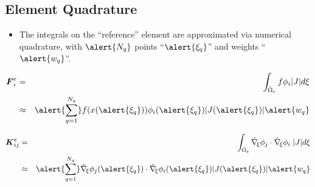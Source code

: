\subsection*{Element Quadrature}
    
\begin{frame}[t]
	\begin{block}{}
	\begin{itemize}    
	\item
	  The integrals on the ``reference'' element are approximated via numerical
	  quadrature, with $\alert{N_q}$ points
		``$\alert{\xi_q}$'' and weights ``$\alert{w_q}$''.
	\end{itemize}
	\end{block}
	\begin{eqnarray}
	  \nonumber
		\bv{F}^e_{i} &=&
		\int_{\hat{\Omega}_e} f \phi_i |J| d\xi
		\\ \nonumber
		    &\approx&
		    \alert{\sum_{q=1}^{N_q}}
		    f(x(\alert{\xi_q})) \phi_i(\alert{\xi_q})
		    |J(\alert{\xi_q})| \alert{w_q}
	\end{eqnarray}

	\begin{eqnarray}
	  \nonumber
		\bv{K}^e_{ij} &=&
		\int_{\hat{\Omega}_e}
		\hat{\nabla}_{\!\xi}\phi_j \cdot
		\hat{\nabla}_{\!\xi}\phi_i \;|J| d\xi
		\\ \nonumber
		    &\approx&
		    \alert{\sum_{q=1}^{N_q}}
		    \hat{\nabla}_{\!\xi} \phi_j(\alert{\xi_q}) \cdot
		    \hat{\nabla}_{\!\xi} \phi_i(\alert{\xi_q})
		    |J(\alert{\xi_q})| \alert{w_q}
	\end{eqnarray}
\end{frame}
